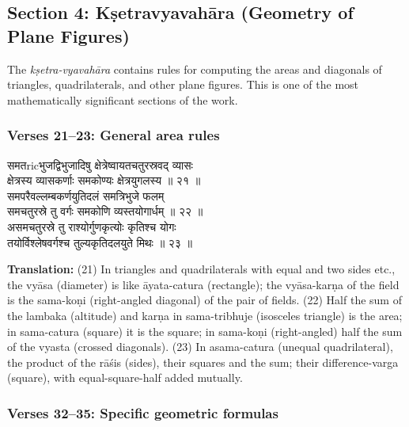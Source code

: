 \documentclass[11pt,a4paper]{article}
\newcommand{\dev}[1]{{\devanagarifont #1}}
\newcommand{\sanskritcol}[1]{%
  \begin{minipage}[t]{0.47\textwidth}
  \vspace{0pt}
  \begin{flushleft}
  #1
  \end{flushleft}
  \end{minipage}%
  \hfill
}
\newcommand{\englishcol}[1]{%
  \begin{minipage}[t]{0.47\textwidth}
  \vspace{0pt}
  \begin{flushleft}
  #1
  \end{flushleft}
  \end{minipage}%
}
\begin{document}
\subsection*{Section 4: Kṣetravyavahāra (Geometry of Plane Figures)}

The \textit{kṣetra-vyavahāra} contains rules for computing the areas and diagonals
of triangles, quadrilaterals, and other plane figures. This is one of the most
mathematically significant sections of the work.

\subsubsection*{Verses 21--23: General area rules}

\noindent
\sanskritcol{\dev{समतricभुजद्विभुजादिषु क्षेत्रेष्वायतचतुरस्रवद् व्यासः} \\ \dev{क्षेत्रस्य व्यासकर्णाः समकोण्यः क्षेत्रयुगलस्य ॥ २१ ॥} \\[0.2cm]
\dev{समपरैवल्लम्बकर्णयुतिदलं समत्रिभुजे फलम्} \\ \dev{समचतुरस्रे तु वर्गः समकोणि व्यस्तयोगार्धम् ॥ २२ ॥} \\[0.2cm]
\dev{असमचतुरस्रे तु राश्योर्गुणकृत्योः कृतिश्च योगः} \\ \dev{तयोर्विश्लेषवर्गश्च तुल्यकृतिदलयुते मिथः ॥ २३ ॥}}
\englishcol{\textbf{Translation:} (21) In triangles and quadrilaterals with equal and two sides
etc., the vyāsa (diameter) is like āyata-catura (rectangle); the vyāsa-karṇa of
the field is the sama-koṇi (right-angled diagonal) of the pair of fields. (22)
Half the sum of the lambaka (altitude) and karṇa in sama-tribhuje (isosceles
triangle) is the area; in sama-catura (square) it is the square; in sama-koṇi
(right-angled) half the sum of the vyasta (crossed diagonals). (23) In asama-catura
(unequal quadrilateral), the product of the rāśis (sides), their squares and the
sum; their difference-varga (square), with equal-square-half added mutually.}

\subsubsection*{Verses 32--35: Specific geometric formulas}
\end{document}
